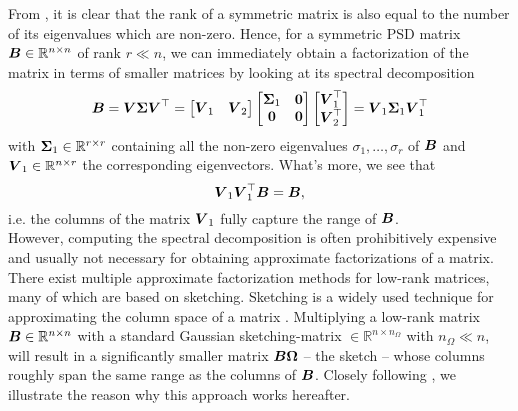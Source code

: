 From , it is clear that the rank of a symmetric
matrix is also equal to the number of its eigenvalues which are non-zero.
Hence, for a symmetric \gls{PSD} matrix $\boldsymbol{B} \in \mathbb{R}^{n \times n}$
of rank $r \ll n$, we can immediately obtain a factorization of the matrix in
terms of smaller matrices by looking at its spectral decomposition
\begin{equation}
    \boldsymbol{B}
        = \boldsymbol{V} \boldsymbol{\Sigma} \boldsymbol{V}^{\top} 
        = \begin{bmatrix} \boldsymbol{V}_1 & \boldsymbol{V}_2 \end{bmatrix} 
          \begin{bmatrix} \boldsymbol{\Sigma}_1 & \boldsymbol{0} \\ \boldsymbol{0} & \boldsymbol{0} \end{bmatrix} 
          \begin{bmatrix} \boldsymbol{V}_1^{\top} \\ \boldsymbol{V}_2^{\top} \end{bmatrix}
        = \boldsymbol{V}_1 \boldsymbol{\Sigma}_1 \boldsymbol{V}_1^{\top}
    \label{equ:3-nystrom-eigenvalue-decoposition}
\end{equation}
with $\boldsymbol{\Sigma}_1 \in \mathbb{R}^{r \times r}$ containing all the non-zero
eigenvalues $\sigma_1, \dots, \sigma_r$ of $\boldsymbol{B}$ and $\boldsymbol{V}_1 \in \mathbb{R}^{n \times r}$ the corresponding
eigenvectors. What's more, we see that
\begin{equation}
    \boldsymbol{V}_1 \boldsymbol{V}_1^{\top} \boldsymbol{B} = \boldsymbol{B},
    \label{equ:3-nystrom-range-captured}
\end{equation}
i.e. the columns of the matrix $\boldsymbol{V}_1$ fully capture the range of $\boldsymbol{B}$.\\

However, computing the spectral
decomposition is often prohibitively expensive and usually not necessary for
obtaining approximate factorizations of a matrix. There exist multiple approximate
factorization methods for low-rank matrices, many of which are based on sketching.
Sketching is a widely used technique for approximating the column space of a matrix
\cite{halko2011finding,woodruff2014sketching,lin2017randomized,tropp2017sketching,tropp2023randomized}.
Multiplying a low-rank matrix $\boldsymbol{B} \in \mathbb{R}^{n \times n}$ with a standard Gaussian
\gls{sketching-matrix} $\in \mathbb{R}^{n \times n_{\Omega}}$ with $n_{\Omega} \ll n$, will
result in a significantly smaller matrix $\boldsymbol{B}\boldsymbol{\Omega}$ -- the sketch -- whose
columns roughly span the same range as the columns of $\boldsymbol{B}$.
Closely following \cite[section~2.1]{tropp2023randomized}, we illustrate the
reason why this approach works hereafter.\\

